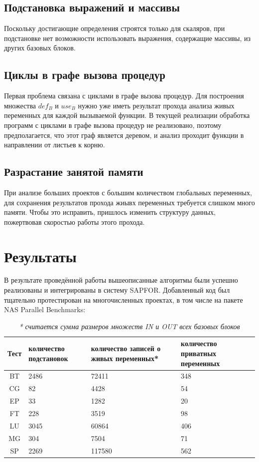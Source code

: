 \documentclass{article}
\begin{document}
\subsection*{Подстановка выражений и массивы}
    Поскольку достигающие определения строятся только для скаляров, при подстановке нет возможности использовать выражения, содержащие массивы, из других базовых блоков.

\subsection*{Циклы в графе вызова процедур}
    Первая проблема связана с циклами в графе вызова процедур. Для построения множества $def_B$ и $use_B$ нужно уже иметь результат прохода анализа живых переменных для каждой вызываемой функции. В текущей реализации обработка программ с циклами в графе вызова процедур не реализовано, 
    поэтому предполагается, что этот граф является деревом, и анализ проходит функции в направлении от листьев к корню.

\subsection*{Разрастание занятой памяти}
    При анализе больших проектов с большим количеством глобальных переменных, для сохранения результатов прохода жиывх переменных требуется слишком много памяти. Чтобы это исправить, пришлось изменить структуру данных, пожертвовав скоростью работы этого прохода.

\section{Результаты}
    В результате проведённой работы вышеописанные алгоритмы были успешно реализованы и интегрированы в систему SAPFOR.
    Добавленный код был тщательно протестирован на многочисленных проектах, в том числе на пакете NAS Parallel Benchmarks\cite{npb}:
\\

\begin{table}[h!]
    \centering
\begin{tabular}{ | c || p{2.5cm} | p{3.5cm} | p{2.5cm} |  }
 \hline
 Тест& количество подстановок & количество записей о живых переменных* &количество приватных переменных\\
 \hline
 BT & 2486 & 72411 & 348 \\
 \hline
CG & 82 & 4428 & 54 \\
\hline
EP & 33 & 1282 & 20 \\
\hline
FT & 228 & 3519 & 98 \\
\hline
LU & 3045 & 60864 & 406 \\
\hline
MG & 304 & 7504 & 71 \\
\hline
SP & 2269 & 117580 & 562 \\
 \hline
\end{tabular}
\caption*{\textit{* считается сумма размеров множеств IN и OUT всех базовых блоков }}
\end{table}


\printbibliography %
\end{document}
